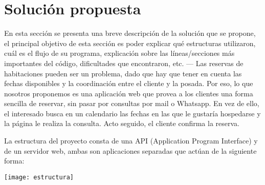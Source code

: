 \section{Solución propuesta}

En esta sección se presenta una breve descripción de la solución que se propone, el principal objetivo de esta sección es poder explicar qué estructuras utilizaron, cuál es el flujo de su programa, explicación sobre las líneas/secciones más importantes del código, dificultades que encontraron, etc.
—
Las reservas de habitaciones pueden ser un problema, dado que hay que tener en cuenta las fechas disponibles y la coordinación entre el cliente y la posada. Por eso, lo que nosotros proponemos es una aplicación web que provea a los clientes una forma sencilla de reservar, sin pasar por consultas por mail o Whatsapp. En vez de ello, el interesado busca en un calendario las fechas en las que le gustaría hospedarse y la página le realiza la consulta. Acto seguido, el cliente confirma la reserva.

La estructura del proyecto consta de una API (Application Program Interface) y de un servidor web, ambas son aplicaciones separadas que actúan de la siguiente forma:

\texttt{[image: estructura]}
